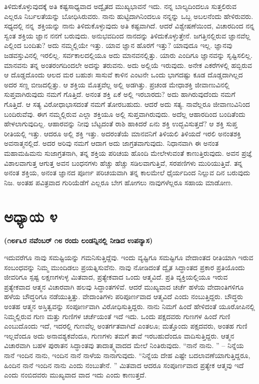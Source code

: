 ತಿಳಿದುಕೊಳ್ಳುವುದಕ್ಕೆ ಅತಿ ಕಷ್ಟಸಾಧ್ಯವಾದ ಅದ್ವೈತದ ಮುಖ್ಯಭಾವನೆ ಇದು. ನನ್ನ ಬಾಲ್ಯದಿಂದಲೂ ಸುತ್ತಲಿರುವ ಎಲ್ಲರೂ ನಿರ್ಬಲತೆಯನ್ನು ಬೋಧಿಸಿರುವರು. ನಾನು ಹುಟ್ಟಿದಾಗಿನಿಂದಲೂ ನನ್ನನ್ನು ಒಬ್ಬ ಅಬಲನೆಂದು ಹೇಳಿರುವರು. ಸಧ್ಯದಲ್ಲಿ ನನ್ನ\break\ ಶಕ್ತಿಯನ್ನು ನಾನು ತಿಳಿದುಕೊಳ್ಳುವುದು ಅತಿ ಕಷ್ಟವಾಗಿದೆ. ಆದರೆ ವಿಶ್ವೇಷಣೆಯಿಂದ, ವಿಚಾರದಿಂದ ನನ್ನ ಸ್ವಂತ ಶಕ್ತಿಯ ಜ್ಞಾನ ನನಗೆ ಬರುವುದು. ಅನುಭವದಿಂದ ನಾನದನ್ನು ತಿಳಿದುಕೊಳ್ಳುತ್ತೇನೆ. ಜಗತ್ತಿನಲ್ಲಿರುವ ಜ್ಞಾನವೆಲ್ಲ ಎಲ್ಲಿಂದ ಬಂದಿತು? ಅದು ನಮ್ಮಲ್ಲಿಯೇ ಇತ್ತು. ಯಾವ ಜ್ಞಾನ ಹೊರಗೆ ಇತ್ತು? ಯಾವುದೂ ಇಲ್ಲ. ಜ್ಞಾನವು ಜಡವಸ್ತುವಿನಲ್ಲಿ ಇರಲಿಲ್ಲ. ಸರ್ವಕಾಲದಲ್ಲಿಯೂ ಅದು ಮಾನವನಲ್ಲಿತ್ತು. ಯಾರು ಎಂದಿಗೂ ಜ್ಞಾನವನ್ನು ಸೃಷ್ಟಿಸಲಿಲ್ಲ. ಮಾನವನು ತನ್ನ ಅಂತರಂಗದಿಂದಲೇ ಅದನ್ನು ತರುವನು. ಅದು ಅಲ್ಲಿಯೆ ಇರುವುದು. ಅನೇಕ ಎಕರೆಗಳಲ್ಲಿ ಹಬ್ಬಿರುವ ಆ ದೊಡ್ಡದೊಂದು ಆಲದ ಮರ ಬಹುಶಃ ಸಾಸುವೆ ಕಾಳಿನ ಎಂಟನೇ ಒಂದು ಭಾಗದಷ್ಟು ಕೂಡ ದೊಡ್ಡದಾಗಿಲ್ಲದ ಅದರ ಸಣ್ಣ ಬೀಜದಲ್ಲಿತ್ತು. ಆ ಶಕ್ತಿಯ ಮೊತ್ತವೆಲ್ಲ ಅಲ್ಲಿ ಅಡಗಿತ್ತು. ಪ್ರಚಂಡ ಮೇಧಾಶಕ್ತಿ ಜೀವಾಣುವಿನಲ್ಲಿ ಸುಪ್ತವಾಗಿರುವುದು ನಮಗೆ ಗೊತ್ತಿದೆ. ಅನಂತ ಶಕ್ತಿ ಏಕೆ ಅಲ್ಲಿ ಇರಬಾರದು? ಅದು ಹಾಗಿರುವುದೆಂದು ನಮಗೆ ಗೊತ್ತಿದೆ. ಆ ಸತ್ಯ ವಿರೋಧಾಭಾಸದಂತೆ ನಮಗೆ ತೋರಬಹುದು. ಆದರೆ ಅದು ಸತ್ಯ. ನಾವೆಲ್ಲರೂ ಜೀವಾಣುವಿನಿಂದ ಬಂದಿರುವೆವು. ಈಗ ನಮ್ಮಲ್ಲಿರುವ ಎಲ್ಲಾ ಶಕ್ತಿಯೂ ಅಲ್ಲಿ ಸುಪ್ತವಾಗಿರುವುದು. ಅದೆಲ್ಲ ಆಹಾರದಿಂದ ಬಂದಿತೆಂದು ಹೇಳಲಾಗುವುದಿಲ್ಲ. ಆಹಾರವನ್ನು ನೀವು ಬೆಟ್ಟದಂತೆ ರಾಶಿ ಹಾಕಿದರೆ ಏನು ಶಕ್ತಿ ಉದ್ಭವಿಸುತ್ತದೆ? ಆ ಶಕ್ತಿ ಸುಪ್ತ ರೀತಿಯಲ್ಲಿ ಇತ್ತು. ಆದರೂ ಅಲ್ಲಿ ಶಕ್ತಿ ಇತ್ತು. ಅದರಂತೆಯೆ ಮಾನವನಿಗೆ ತಿಳಿಯಲಿ ತಿಳಿಯದೆ ಇರಲಿ ಅನಂತಶಕ್ತಿ ಅವನಾತ್ಮನಲ್ಲಿದೆ. ಅದರ ಅರಿವು ನಮಗೆ ಆದಾಗ ಅದು ಜಾಗ್ರತವಾಗುವುದು. ನಿಧಾನವಾಗಿ ಈ ಅನಂತ ಮಹಾಮಹಿಮನು ಸುಜಾಗ್ರತನಾಗಿ, ತನ್ನ ಶಕ್ತಿಯ ಪರಿಚಯ ಹೊಂದಿ ಮೇಲೇಳುವಂತೆ ಕಾಣುತ್ತಿರುವುದು. ಅವನ ಪ್ರಜ್ಞೆ ವಿಶಾಲವಾಗುತ್ತ ಆಗುತ್ತ ಅವನ ಬಂಧನಗಳು ಹೆಚ್ಚು ಹೆಚ್ಚು ಸಡಿಲವಾಗುತ್ತಿವೆ, ಸರಪಣಿಗಳು ಮುರಿಯುತ್ತಿವೆ. ತನ್ನ ಅನಂತ ಶಕ್ತಿಯ, ಅನಂತ ಜ್ಞಾನದ ಪೂರ್ಣ ಪರಿಚಯವಾಗಿ ತನ್ನ ಕಾಲಮೇಲೆ ಧೈರ್ಯದಿಂದ ನಿಲ್ಲುವ ದಿನ ಬರುವುದು ನಿಜ. ಅಂತಹ ಪವಿತ್ರವಾದ ಗುರಿಯೆಡೆಗೆ ಎಲ್ಲರೂ ಬೇಗ ಹೋಗಲು ನಾವುಗಳೆಲ್ಲರೂ ಸಹಾಯ ಮಾಡೋಣ.

\chapter{ಅಧ್ಯಾಯ ೪}

\begin{center}
\textbf{(೧೮೯೬ರ ನವೆಂಬರ್​ ೧೮ ರಂದು ಲಂಡನ್ನಿನಲ್ಲಿ ನೀಡಿದ ಉಪನ್ಯಾಸ)}
\end{center}

ಇದುವರೆಗೂ ನಾವು ಸಮಷ್ಟಿಯನ್ನು ಗಮನಿಸುತ್ತಿದ್ದೆವು. ಇಂದು ವ್ಯಷ್ಟಿಗೂ ಸಮಷ್ಟಿಗೂ ವೇದಾಂತದ ರೀತಿಯಾಗಿ ಇರುವ ಸಂಬಂಧವನ್ನು ನಿಮ್ಮ ಮುಂದಿಡಲು ಪ್ರಯತ್ನಿಸುವೆನು. ನಾವು ನೋಡಿದಂತೆ ದ್ವೈತ ಸಿದ್ಧಾಂತದ ಪ್ರಕಾರ ಪ್ರತಿಯೊಂದು ಜೀವರಿಗೂ ಸ್ಪಷ್ಟ ಲಕ್ಷಣಗಳುಳ್ಳ ಮಿತವಾದ, ಪ್ರತ್ಯೇಕವಾದ ಒಂದು ಆತ್ಮವಿದೆ. ಪ್ರತಿ ವ್ಯಕ್ತಿಯಲ್ಲಿಯೂ ಇರುವ ಪ್ರತ್ಯೇಕವಾದ ಆತ್ಮನ ವಿಚಾರವಾಗಿ ಹಲವು ಸಿದ್ಧಾಂತಗಳಿವೆ. ಆದರೆ ಮುಖ್ಯವಾದ ಚರ್ಚೆ ಹಳೆಯ ವೇದಾಂತಿಗಳಿಗೂ ಹಳೆಯ ಬೌದ್ಧರಿಗೂ ನಡೆಯುತ್ತಿತ್ತು. ವೇದಾಂತಿಗಳು ಪರಿಪೂರ್ಣವಾದ ಆತ್ಮವಿದೆ ಎಂದು ನಂಬುತ್ತಿದ್ದರು. ಬೌದ್ಧರು ಅಂತಹ ಆತ್ಮನ ಅಸ್ತಿತ್ವವನ್ನು ಸಂಪೂರ್ಣವಾಗಿ ವಿರೋಧಿಸುತ್ತಿದ್ದರು. ನಾನು ನಿಮಗೆ ಹಿಂದೆ ಹೇಳಿದಂತೆ ಯೂರೋಪಿನಲ್ಲಿ ನಿಮ್ಮಲ್ಲಿರುವ ಗುಣ ಮತ್ತು ಗುಣಿಗಳ ಚರ್ಚೆಯಂತೆ ಇದೆ ಇದು. ಒಂದು ಪಕ್ಷದವರು ಗುಣಗಳ ಹಿಂದೆ ಗುಣಿ ಎಂಬುದೊಂದು ಇದೆ, ಇದರಲ್ಲಿ ಗುಣವೆಲ್ಲ ಅಂತರ್ಗತವಾಗಿದೆ ಎಂತಲೂ; ಮತ್ತೊಂದು ಪಕ್ಷದವರು, ಅಂತಹ ಗುಣಿ ಇಲ್ಲವೆಂದೂ ಅದು ಅನಾವಶ್ಯಕವೆಂದೂ, ಗುಣಗಳು ತಮಗೆ ತಾವೆ ಇರಬಹುದೆಂದೂ ವಾದಿಸುತ್ತಿದ್ದರು. ಆತ್ಮನ ವಿಚಾರವಾಗಿ ಬಹಳ ಪುರಾತನ ಸಿದ್ಧಾಂತವು ತಾದಾತ್ಮ್ಯವಾದದ ಮೇಲೆ ನಿಂತಿರುವುದು. “ನಾನೆ ನಾನು. ” – ನಿನ್ನೆಯ ನಾನೆ ಇಂದಿನ ನಾನು, ಇಂದಿನ ನಾನೆ ನಾಳೆಯ ನಾನಾಗುವುದು. “ನಿನ್ನೆಯ ದೇಹ ಎಷ್ಟೇ ಬದಲಾವಣೆಯಾಗುತ್ತಿದ್ದರೂ, ಹಿಂದಿನ ನಾನೆ ಇಂದಿನ ನಾನು ಎಂದು ನಂಬುತೇನೆ. ” ಮಿತವಾದ ಆದರೂ ಸಂಪೂರ್ಣವಾದ ಪ್ರತ್ಯೇಕ ಆತ್ಮವು ಇದೆ ಎಂದು ನಂಬಿದವರು ಮುಖ್ಯವಾದ ವಾದ ಇದು ಎಂದು ಕಾಣುತ್ತದೆ. 

